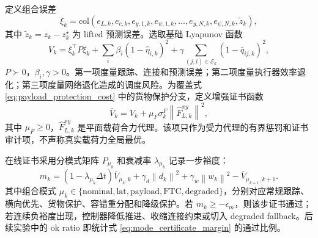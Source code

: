 \documentclass[twocolumn,3p,times,procedia]{elsarticle}
\newcommand{\norm}[1]{\left\lVert #1 \right\rVert}
\begin{document}
定义组合误差
\begin{equation}
\xi_k=\mathrm{col}\left(e_{L,k},e_{c,k},e_{y,1,k},e_{\psi,1,k},\ldots,e_{y,N,k},e_{\psi,N,k},\tilde z_k\right),
\label{eq:xi_def}
\end{equation}
其中 $\tilde z_k=z_k-z_k^\star$ 为 lifted 预测误差。选取基础 Lyapunov 函数
\begin{equation}
V_k=\xi_k^\top P\xi_k+\sum_i \beta_i(1-\hat\eta_{i,k})^2+\gamma\sum_{(j,i)\in\mathcal E_k}(1-\bar q_{ij,k})^2 ,
\label{eq:lyapunov}
\end{equation}
$P\succ0$，$\beta_i,\gamma>0$。第一项度量跟踪、连接和预测误差；第二项度量执行器效率退化；第三项度量网络退化造成的调度风险。为覆盖式 \eqref{eq:payload_protection_cost} 中的货物保护分支，定义增强证书函数
\begin{equation}
\bar V_k=V_k+\mu_F\sigma_k^F\norm{\hat F_{L,k}^{xy}}^2 ,
\label{eq:augmented_lyapunov}
\end{equation}
其中 $\mu_F\ge0$，$\hat F_{L,k}^{xy}$ 是平面载荷合力代理。该项只作为受力代理的有界惩罚和证书审计项，不声称真实载荷力全局最优。

在线证书采用分模式矩阵 $P_{\mu_k}$ 和衰减率 $\lambda_{\mu_k}$ 记录一步裕度：
\begin{equation}
m_k=(1-\lambda_{\mu_k}\Delta t)\bar V_{\mu_k,k}
+\gamma_d\norm{d_k}^2+\gamma_w\norm{w_k}^2
-\bar V_{\mu_{k+1},k+1}.
\label{eq:mode_certificate_margin}
\end{equation}
其中组合模式 $\mu_k\in\{\mathrm{nominal},\mathrm{lat},\mathrm{payload},\mathrm{FTC},\mathrm{degraded}\}$，分别对应常规跟踪、横向优先、货物保护、容错重分配和降级保护。若 $m_k\ge -\epsilon_m$，则该步证书通过；若连续负裕度出现，控制器降低推进、收缩连接约束或切入 degraded fallback。后续实验中的 ok ratio 即统计式 \eqref{eq:mode_certificate_margin} 的通过比例。
\end{document}
